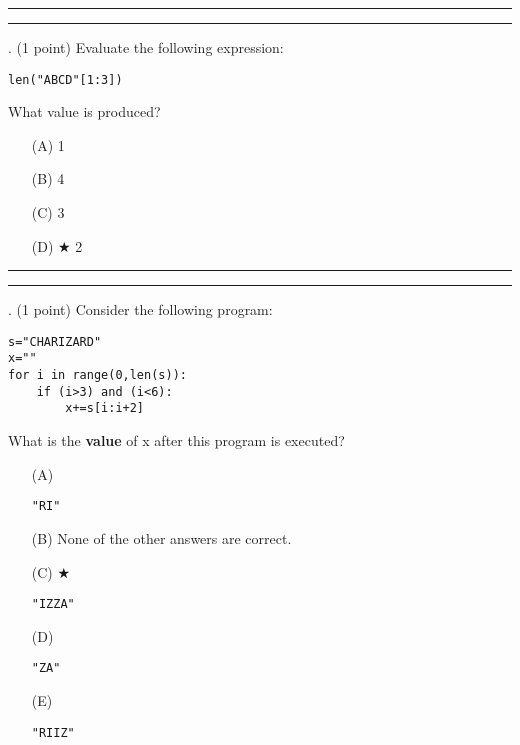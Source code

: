 \documentclass{article}
\begin{document}
\vspace*{2em}
\hrule
\vspace{2em}

\vspace{2em}
\hrule height 2pt


\newpage
{}. (1 point)
Evaluate the following expression:
\begin{verbatim}
len("ABCD"[1:3])
\end{verbatim}
What value is produced?


\begin{enumerate}
\item[(A)]
1

\item[(B)]
4

\item[(C)]
3

\item[(D)] $\bigstar$ 
2

\end{enumerate}

\vspace*{2em}
\hrule
\vspace{2em}

\vspace{2em}
\hrule height 2pt


\newpage
{}. (1 point)
Consider the following program:
\begin{verbatim}
s="CHARIZARD"
x=""
for i in range(0,len(s)):
    if (i>3) and (i<6):
        x+=s[i:i+2]
\end{verbatim}
What is the \textbf{value} of x after this program is executed?


\begin{enumerate}
\item[(A)]
\begin{verbatim}"RI"\end{verbatim}

\item[(B)]
None of the other answers are correct.

\item[(C)] $\bigstar$ 
\begin{verbatim}"IZZA"\end{verbatim}

\item[(D)]
\begin{verbatim}"ZA"\end{verbatim}

\item[(E)]
\begin{verbatim}"RIIZ"\end{verbatim}

\end{enumerate}
\end{document}

